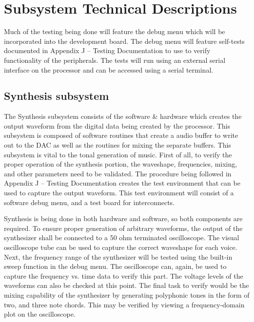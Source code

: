 \documentclass[bibtotocnumbered,abstract=on,paper=a4,fontsize=12pt,parskip=on,halfparskip=on]{scrartcl}		%
\begin{document}
\section{Subsystem Technical Descriptions}
  Much of the testing being done will feature the debug menu which will be incorporated into the development board. The debug menu will feature self-tests documented in  Appendix J – Testing Documentation to use to verify functionality of the peripherals. The tests will run using an external serial interface on the processor and can be accessed using a serial terminal.\par
  \subsection{Synthesis subsystem}
    The Synthesis subsystem consists of the software \& hardware which creates the output waveform from the digital data being created by the processor. This subsystem is composed of software routines that create a audio buffer to write out to the DAC as well as the routines for mixing the separate buffers. This subsystem is vital to the tonal generation of music. First of all, to verify the proper operation of the synthesis portion, the waveshape, frequencies, mixing, and other parameters need to be validated. The procedure being followed in Appendix J – Testing Documentation creates the test environment that can be used to capture the output waveform. This test environment will consist of a software debug menu, and a test board for interconnects.\par
      Synthesis is being done in both hardware and software, so both components are required. To ensure proper generation of arbitrary waveforms, the output of the synthesizer shall be connected to a 50 ohm terminated oscilloscope. The visual oscilloscope tube can be used to capture the correct waveshape for each voice. Next, the frequency range of the synthesizer will be tested using the built-in sweep function in the debug menu. The oscilloscope can, again, be used to capture the frequency vs. time data to verify this part. The voltage levels of the waveforms can also be checked at this point. The final task to verify would be the mixing capability of the synthesizer by generating polyphonic tones in the form of two, and three note chords. This may be verified by viewing a frequency-domain plot on the oscilloscope.\par
\end{document}
